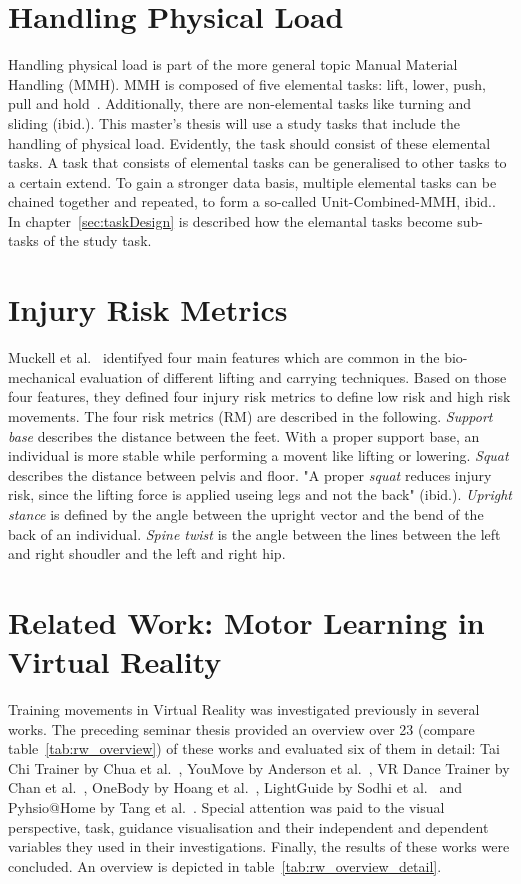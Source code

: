 \section{Handling Physical Load}
\label{section:handlingphysicalload}
Handling physical load is part of the more general topic Manual Material Handling (MMH). MMH is composed of five elemental tasks: lift, lower, push, pull and hold~\cite{mmh}. Additionally, there are non-elemental tasks like turning and sliding (ibid.). This master's thesis will use a study tasks that include the handling of physical load. Evidently, the task should consist of these elemental tasks. A task that consists of elemental tasks can be generalised to other tasks to a certain extend. To gain a stronger data basis, multiple elemental tasks can be chained together and repeated, to form a so-called Unit-Combined-MMH, ibid.. In chapter~\ref{sec:taskDesign} is described how the elemantal tasks become sub-tasks of the study task.

\section{Injury Risk Metrics}
\label{section:rm}
Muckell et al.~\cite{muckell} identifyed four main features which are common in the bio-mechanical evaluation of different lifting and carrying techniques. Based on those four features, they defined four injury risk metrics to define low risk and high risk movements.  The four risk metrics (RM) are described in the following. \textit{Support base} describes the distance between the feet. With a proper support base, an individual is more stable while performing a movent like lifting or lowering. \textit{Squat} describes the distance between pelvis and floor. "A proper \textit{squat} reduces injury risk, since the lifting force is applied useing legs and not the back" (ibid.). \textit{Upright stance} is defined by the angle between the upright vector and the bend of the back of an individual. \textit{Spine twist} is the angle between the lines between the left and right shoudler and the left and right hip.

\section{Related Work: Motor Learning in Virtual Reality}
\label{section:related_work}
Training movements in Virtual Reality was investigated previously in several works. The preceding seminar thesis provided an overview over 23 (compare table~\ref{tab:rw_overview}) of these works and evaluated six of them in detail: Tai Chi Trainer by Chua et al.~\cite{thaichichua}, YouMove by Anderson et al.~\cite{YouMove}, VR Dance Trainer by Chan et al.~\cite{vrdancetrainer}, OneBody by Hoang et al.~\cite{onebody}, LightGuide by Sodhi et al.~\cite{lightguide} and Pyhsio@Home by Tang et al.~\cite{physioathome}. Special attention was paid to the visual perspective, task, guidance visualisation and their independent and dependent variables they used in their investigations. Finally, the results of these works were concluded. An overview is depicted in table~\ref{tab:rw_overview_detail}.

